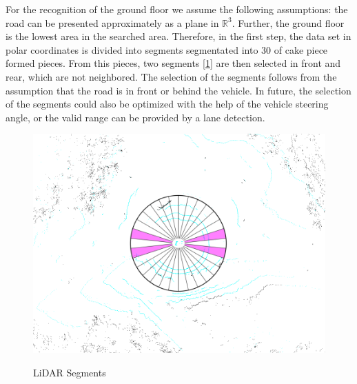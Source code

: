 \documentclass[11pt,oneside,openright]{mpreport}
\begin{document}

For the recognition of the ground floor we assume the following assumptions: the road can be presented approximately as a plane in $\mathbb{R}^3$.
Further, the ground floor is the lowest area in the searched area. Therefore, in the first step, the data set in polar coordinates is divided into segments segmentated into 30 of cake piece formed pieces.
From this pieces, two segments [\cref{segments}] are then selected in front and rear, which are not neighbored. The selection of the segments follows from the assumption
that the road is in front or behind the vehicle. In future, the selection of the segments could also be optimized with the help of the vehicle steering angle,
or the valid range can be provided by a lane detection.

\begin{figure}[!ht]
\caption{LiDAR Segments}
\includegraphics[width=\textwidth]{bilder/segments.png}
\label{segments}
\end{figure}
\end{document}
